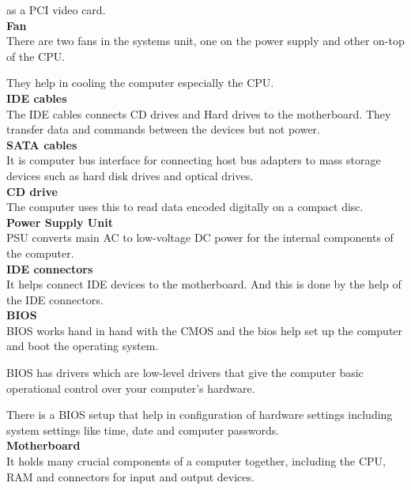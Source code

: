 \documentclass{article}
\begin{document}
as a PCI video card.\\
\textbf{Fan}\\
There are two fans in the systems unit, one on the power supply and other on-top of the CPU.
\par They help in cooling the computer especially the CPU.\\
\textbf{IDE cables}\\
The IDE cables connects CD drives and Hard drives to the motherboard. They transfer data and commands between the devices but not power.\\
\textbf{SATA cables}\\
It is computer bus interface for connecting host bus adapters to mass storage devices such as hard disk drives and optical drives.\\
\textbf{CD drive}\\
The computer uses this to read data encoded digitally on a compact disc.\\
\textbf{Power Supply Unit}\\
PSU converts main AC to low-voltage DC power for the internal components of the computer.\\
\textbf{IDE connectors}\\
It helps connect IDE devices to the motherboard. And this is done by the help of the IDE connectors.\\
\textbf{BIOS}\\
BIOS works hand in hand with the CMOS and the bios help set up the computer and boot the operating system.
\par BIOS has drivers which are low-level drivers that give the computer basic operational control over your computer's hardware.
\par There is a BIOS setup that help in configuration of hardware settings including system settings like time, date and computer passwords.\\
\textbf{Motherboard}\\
It holds many crucial components of a computer together, including the CPU, RAM and connectors for input and output devices.
\end{document}
